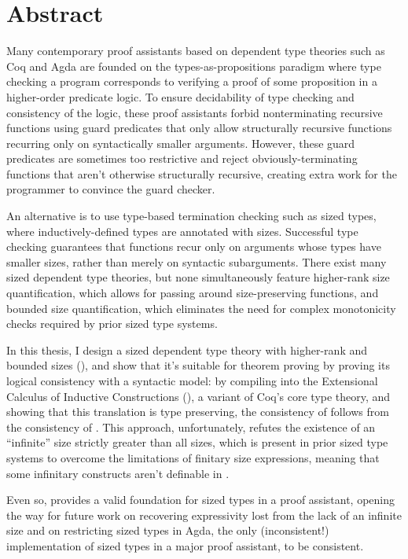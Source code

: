 \chapter{Abstract}

Many contemporary proof assistants based on dependent type theories such as Coq and Agda
are founded on the types-as-propositions paradigm where type checking a program
corresponds to verifying a proof of some proposition in a higher-order predicate logic.
To ensure decidability of type checking and consistency of the logic,
these proof assistants forbid nonterminating recursive functions
using guard predicates that only allow structurally recursive functions
recurring only on syntactically smaller arguments.
However, these guard predicates are sometimes too restrictive
and reject obviously-terminating functions that aren't otherwise structurally recursive,
creating extra work for the programmer to convince the guard checker.

An alternative is to use type-based termination checking such as sized types,
where inductively-defined types are annotated with sizes.
Successful type checking guarantees that functions recur only on arguments whose types have smaller sizes,
rather than merely on syntactic subarguments.
There exist many sized dependent type theories,
but none simultaneously feature higher-rank size quantification,
which allows for passing around size-preserving functions,
and bounded size quantification,
which eliminates the need for complex monotonicity checks required by prior sized type systems.

In this thesis, I design a sized dependent type theory with higher-rank and bounded sizes (\lang),
and show that it's suitable for theorem proving by proving its logical consistency with a syntactic model:
by compiling \lang into the Extensional Calculus of Inductive Constructions (\CICE),
a variant of Coq's core type theory,
and showing that this translation is type preserving,
the consistency of \lang follows from the consistency of \CICE.
This approach, unfortunately, refutes the existence of an ``infinite'' size strictly greater than all sizes,
which is present in prior sized type systems to overcome the limitations of finitary size expressions,
meaning that some infinitary constructs aren't definable in \lang.

Even so, \lang provides a valid foundation for sized types in a proof assistant,
opening the way for future work on recovering expressivity lost from the lack of an infinite size
and on restricting sized types in Agda,
the only (inconsistent!) implementation of sized types in a major proof assistant,
to be consistent.